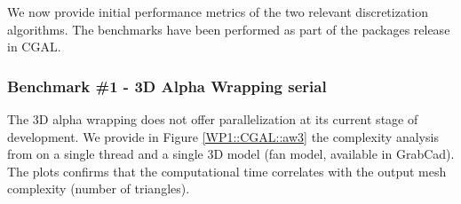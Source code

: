 We now provide initial performance metrics of the two relevant discretization algorithms. The benchmarks have been performed as part of the packages release in CGAL.



\subsubsection{Benchmark \#1 - 3D Alpha Wrapping serial}


The 3D alpha wrapping does not offer parallelization at its current stage of development. We provide in Figure \ref{WP1::CGAL::aw3} the complexity analysis from \cite{portaneri_alpha_2022} on a single thread and a single 3D model (fan model, available in GrabCad). The plots confirms that the computational time correlates with the output mesh complexity (number of triangles).


